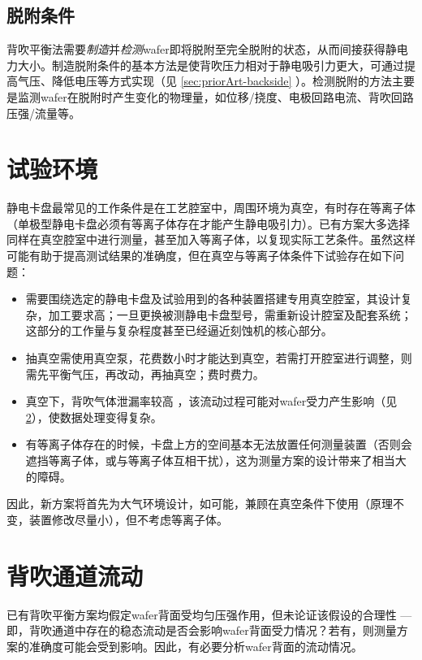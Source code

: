 \subsection{脱附条件}\label{sec:principle-backside-dechuck}

背吹平衡法需要\emph{制造}并\emph{检测}wafer即将脱附至完全脱附的状态，从而间接获得静电力大小。制造脱附条件的基本方法是使背吹压力相对于静电吸引力更大，可通过提高气压、降低电压等方式实现（见 \ref{sec:priorArt-backside} ）。检测脱附的方法主要是监测wafer在脱附时产生变化的物理量，如位移/挠度、电极回路电流、背吹回路压强/流量等。 %



\section{试验环境}\label{sec:principle-env}

静电卡盘最常见的工作条件是在工艺腔室中，周围环境为真空，有时存在等离子体（单极型静电卡盘必须有等离子体存在才能产生静电吸引力）。已有方案大多选择同样在真空腔室中进行测量，甚至加入等离子体，以复现实际工艺条件。虽然这样可能有助于提高测试结果的准确度，但在真空与等离子体条件下试验存在如下问题：
\begin{itemize}
  \item 需要围绕选定的静电卡盘及试验用到的各种装置搭建专用真空腔室，其设计复杂，加工要求高；一旦更换被测静电卡盘型号，需重新设计腔室及配套系统；这部分的工作量与复杂程度甚至已经逼近刻蚀机的核心部分。
  \item 抽真空需使用真空泵，花费数小时才能达到真空，若需打开腔室进行调整，则需先平衡气压，再改动，再抽真空；费时费力。
  \item 真空下，背吹气体泄漏率较高 %
  ，该流动过程可能对wafer受力产生影响（见\ref{sec:principle-flow}），使数据处理变得复杂。
  \item 有等离子体存在的时候，卡盘上方的空间基本无法放置任何测量装置（否则会遮挡等离子体，或与等离子体互相干扰），这为测量方案的设计带来了相当大的障碍。
\end{itemize}

因此，新方案将首先为大气环境设计，如可能，兼顾在真空条件下使用（原理不变，装置修改尽量小），但不考虑等离子体。



\section{背吹通道流动}\label{sec:principle-flow}

已有背吹平衡方案均假定wafer背面受均匀压强作用，但未论证该假设的合理性 ---  即，背吹通道中存在的稳态流动是否会影响wafer背面受力情况？若有，则测量方案的准确度可能会受到影响。因此，有必要分析wafer背面的流动情况。


